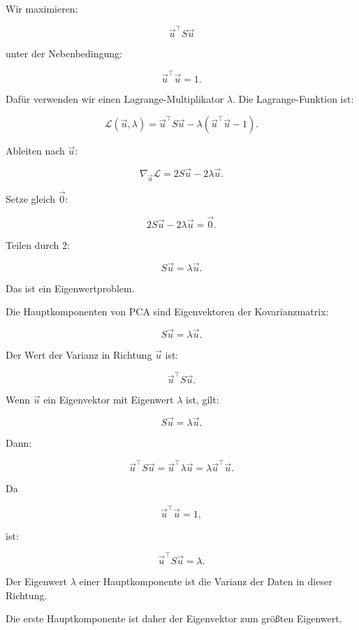 Wir maximieren:

\[
    \vec{u}^{\top}S\vec{u}
\]

unter der Nebenbedingung:

\[
    \vec{u}^{\top}\vec{u}=1.
\]

Dafür verwenden wir einen Lagrange-Multiplikator \(\lambda\).
Die Lagrange-Funktion ist:

\[
    \mathcal{L}(\vec{u},\lambda)
    =
    \vec{u}^{\top}S\vec{u}
    -
    \lambda
    (\vec{u}^{\top}\vec{u}-1).
\]

Ableiten nach \(\vec{u}\):

\[
    \nabla_{\vec{u}}\mathcal{L}
    =
    2S\vec{u}
    -
    2\lambda\vec{u}.
\]

Setze gleich \(\vec{0}\):

\[
    2S\vec{u}
    -
    2\lambda\vec{u}
    =
    \vec{0}.
\]

Teilen durch \(2\):

\[
    S\vec{u}
    =
    \lambda\vec{u}.
\]

Das ist ein Eigenwertproblem.

\begin{definitionbox}
Die Hauptkomponenten von PCA sind Eigenvektoren der Kovarianzmatrix:

\[
    S\vec{u}
    =
    \lambda\vec{u}.
\]
\end{definitionbox}

Der Wert der Varianz in Richtung \(\vec{u}\) ist:

\[
    \vec{u}^{\top}S\vec{u}.
\]

Wenn \(\vec{u}\) ein Eigenvektor mit Eigenwert \(\lambda\) ist, gilt:

\[
    S\vec{u}
    =
    \lambda\vec{u}.
\]

Dann:

\[
    \vec{u}^{\top}S\vec{u}
    =
    \vec{u}^{\top}\lambda\vec{u}
    =
    \lambda\vec{u}^{\top}\vec{u}.
\]

Da

\[
    \vec{u}^{\top}\vec{u}=1,
\]

ist:

\[
    \vec{u}^{\top}S\vec{u}
    =
    \lambda.
\]

\begin{conceptbox}
Der Eigenwert \(\lambda\) einer Hauptkomponente ist die Varianz der Daten in dieser Richtung.
\end{conceptbox}

Die erste Hauptkomponente ist daher der Eigenvektor zum größten Eigenwert.

